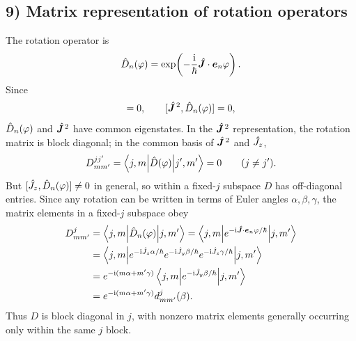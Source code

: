 \subsection*{9) Matrix representation of rotation operators}
The rotation operator is
\begin{equation}
\hat{D}_n(\varphi)=\exp\!\left(-\frac{\mathrm{i}}\hbar\hat{\bm{J}}\cdot\bm{e}_n\varphi\right).
\end{equation}
Since
\begin{equation}
[\op{\vect J}^{\,2},\op{\vect J}]=0,\qquad
[\op{\vect J}^{\,2},\op D_n(\varphi)]=0,
\end{equation}
$\hat{D}_n(\varphi)$ and $\hat{\bm{J}}^{\,2}$ have common eigenstates. In the $\hat{\bm{J}}^{\,2}$ representation, the rotation matrix is block diagonal; in the common basis of $\hat{\bm{J}}^{\,2}$ and $\hat{J}_z$,
\begin{equation}
D^{jj'}_{mm'}=\left\langle j,m\middle|\hat{D}(\varphi)\middle|j',m'\right\rangle=0\qquad(j\ne j').
\end{equation}
But $[\hat{J}_z,\hat{D}_n(\varphi)]\ne0$ in general, so within a fixed-$j$ subspace $D$ has off-diagonal entries. Since any rotation can be written in terms of Euler angles $\alpha,\beta,\gamma$, the matrix elements in a fixed-$j$ subspace obey
\begin{equation}\begin{aligned}
D^j_{mm'}&=\left\langle j,m\middle|\hat{D}_n(\varphi)\middle|j,m'\right\rangle
=\left\langle j,m\middle|e^{-\mathrm{i}\hat{\bm{J}}\cdot\bm{e}_n\varphi/\hbar}\middle|j,m'\right\rangle\\
&=\left\langle j,m\middle|e^{-\mathrm{i}\hat{J}_z\alpha/\hbar}e^{-\mathrm{i}\hat{J}_y\beta/\hbar}
e^{-\mathrm{i}\hat{J}_z\gamma/\hbar}\middle|j,m'\right\rangle\\
&=e^{-\mathrm{i}(m\alpha+m'\gamma)}\left\langle j,m\middle|e^{-\mathrm{i}\hat{J}_y\beta/\hbar}\middle|j,m'\right\rangle\\
&=e^{-\mathrm{i}(m\alpha+m'\gamma)}d^j_{mm'}(\beta).
\end{aligned}\end{equation}
Thus $D$ is block diagonal in $j$, with nonzero matrix elements generally occurring only within the same $j$ block.

